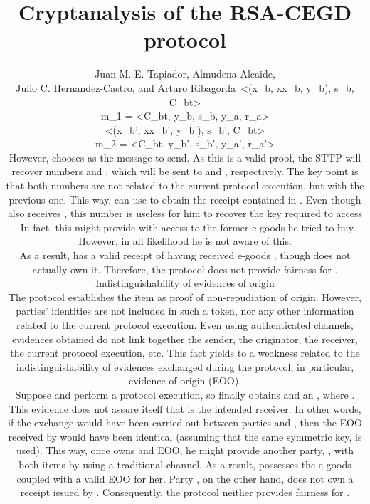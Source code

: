 \documentclass{article}
\begin{document}
\title{Cryptanalysis of the RSA-CEGD protocol}
\author{Juan M. E. Tapiador, Almudena Alcaide,\\
Julio C. Hernandez-Castro, and Arturo Ribagorda\
<(x_b, xx_b, y_b), s_b, C_{bt}>

m_1 = <C_{bt}, y_b, s_b, y_a, r_a>

<(x_b', xx_b', y_b'), s_b', C_{bt}>

m_2 = <C_{bt}, y_b', s_b', y_a', r_a'>


\noindent However,  chooses  as the message to send. As
this is a valid proof, the STTP will recover numbers  and
, which will be sent to  and , respectively. The key
point is that both numbers are not related to the current protocol
execution, but with the previous one. This way,  can use 
to obtain the receipt  contained in . Even though 
also receives , this number is useless for him to recover the
key required to access . In fact, this  might provide
 with access to the former e-goods he tried to buy. However, in
all likelihood he is not aware of this.

As a result,  has a valid receipt of  having received
e-goods , though  does not actually own it. Therefore, the
protocol does not provide fairness for .


\subsection{Indistinguishability of evidences of origin}\label{Sec:EOO}
The protocol establishes the item  as proof of
non-repudiation of origin. However, parties' identities are not
included in such a token, nor any other information related to the
current protocol execution. Even using authenticated channels,
evidences obtained do not link together the sender, the originator,
the receiver, the current protocol execution, etc. This fact yields
to a weakness related to the indistinguishability of evidences
exchanged during the protocol, in particular, evidence of origin
(EOO).

Suppose  and  perform a protocol execution, so finally
 obtains  and an , where
. This evidence does not assure itself that  is
the intended receiver. In other words, if the exchange would have
been carried out between parties  and , then the EOO
received by  would have been identical (assuming that the same
symmetric key,  is used). This way, once  owns  and
EOO, he might provide another party, , with both items by using
a traditional channel. As a result,  possesses the e-goods
coupled with a valid EOO for her. Party , on the other hand,
does not own a receipt issued by . Consequently, the protocol
neither provides fairness for .

}
\end{document}
